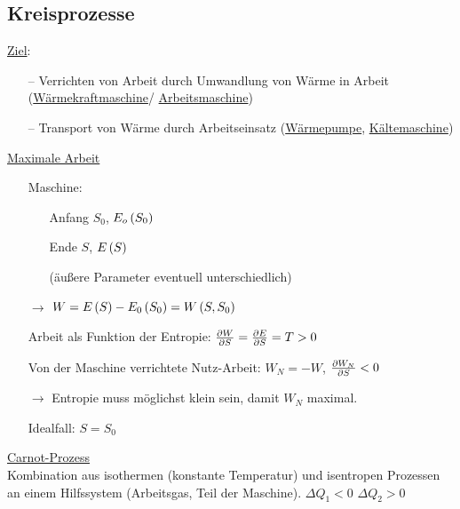 \subsection{Kreisprozesse}
\uline{Ziel}:
\begin{itemize}[align=left]
  \item[--] Verrichten von Arbeit durch Umwandlung von Wärme in Arbeit (\uline{Wärme\-kraft\-maschine}/ \uline{Arbeits\-masch\-ine})
  \item[--] Transport von Wärme durch Arbeitseinsatz (\uline{Wärmepumpe}, \uline{Kältemaschine})
\end{itemize}
\uline{Maximale Arbeit}
\begin{itemize}[align=left]
  \item[Maschine:]
  \begin{itemize}[align=left]
      \item[]
      \item[Anfang] $S_0$, $E_o\left( S_0 \right)$
      \item[Ende] $S$, $E\left( S \right)$
      \item[(äußere Parameter eventuell unterschiedlich)]
    \end{itemize}
  \item[$\rightarrow$] $W=E\left( S \right) - E_0\left( S_0 \right) = W\left( S,S_0 \right)$
  \item[Arbeit als  Funktion der Entropie:] $\frac{\partial W}{\partial S} = \frac{\partial E}{\partial S} = T > 0$
  \item[Von der Maschine verrichtete Nutz-Arbeit:] $W_N = -W$, $\frac{\partial W_N}{\partial S} < 0$
  \item[$\rightarrow$] Entropie muss möglichst klein sein, damit $W_N$ maximal.
  \item[Idealfall:] $S=S_0$
\end{itemize}

\uline{Carnot-Prozess}\\
Kombination aus isothermen (konstante Temperatur) und isentropen Prozessen an einem Hilfssystem (Arbeitsgas, Teil der Maschine). $\Delta Q_1 <0$ $\Delta Q_2 > 0$

